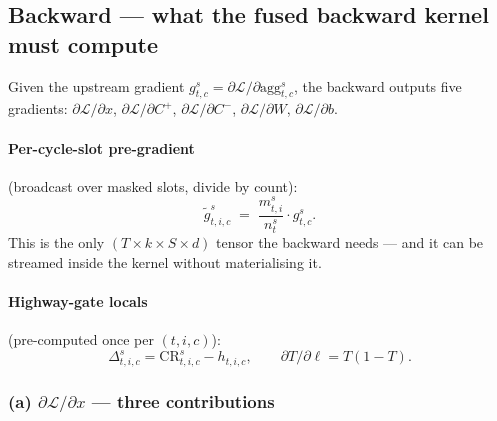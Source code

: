\documentclass[11pt,a4paper]{article}
\begin{document}
\subsection{Backward — what the fused backward kernel must compute}

Given the upstream gradient $g^{s}_{t,c} = \partial \mathcal{L} / \partial \mathrm{agg}^{s}_{t,c}$, the backward outputs five gradients: $\partial\mathcal{L}/\partial x$, $\partial\mathcal{L}/\partial C^{+}$, $\partial\mathcal{L}/\partial C^{-}$, $\partial\mathcal{L}/\partial W$, $\partial\mathcal{L}/\partial b$.

\paragraph{Per-cycle-slot pre-gradient} (broadcast over masked slots, divide by count):
\[
\tilde g^{s}_{t,i,c} \;=\; \frac{m^{s}_{t,i}}{n^{s}_{t}} \cdot g^{s}_{t,c}.
\]
This is the only $(T \times k \times S \times d)$ tensor the backward needs --- and it can be streamed inside the kernel without materialising it.

\paragraph{Highway-gate locals} (pre-computed once per $(t,i,c)$):
\[
\Delta^{s}_{t,i,c} = \mathrm{CR}^{s}_{t,i,c} - h_{t,i,c},
\qquad
\partial T / \partial \ell = T(1-T).
\]

\subsubsection{(a) $\partial \mathcal{L} / \partial x$ — three contributions}
\end{document}
